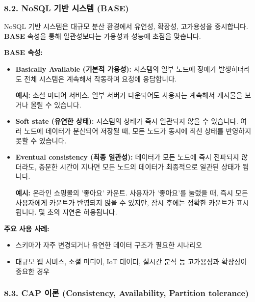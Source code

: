 \documentclass[11pt,a4paper]{article}
\begin{document}
\subsubsection*{8.2. NoSQL 기반 시스템 (BASE)}

\begin{summarybox}
NoSQL 기반 시스템은 대규모 분산 환경에서 유연성, 확장성, 고가용성을 중시합니다. \textbf{BASE} 속성을 통해 일관성보다는 가용성과 성능에 초점을 맞춥니다.
\end{summarybox}

\textbf{BASE 속성:}
\begin{itemize}
    \item \textbf{Basically Available (기본적 가용성):} 시스템의 일부 노드에 장애가 발생하더라도 전체 시스템은 계속해서 작동하며 요청에 응답합니다.
    \begin{examplebox}
    \textbf{예시:} 소셜 미디어 서비스. 일부 서버가 다운되어도 사용자는 계속해서 게시물을 보거나 올릴 수 있습니다.
    \end{examplebox}
    \item \textbf{Soft state (유연한 상태):} 시스템의 상태가 즉시 일관되지 않을 수 있습니다. 여러 노드에 데이터가 분산되어 저장될 때, 모든 노드가 동시에 최신 상태를 반영하지 못할 수 있습니다.
    \item \textbf{Eventual consistency (최종 일관성):} 데이터가 모든 노드에 즉시 전파되지 않더라도, 충분한 시간이 지나면 모든 노드의 데이터가 최종적으로 일관된 상태가 됩니다.
    \begin{examplebox}
    \textbf{예시:} 온라인 쇼핑몰의 '좋아요' 카운트. 사용자가 '좋아요'를 눌렀을 때, 즉시 모든 사용자에게 카운트가 반영되지 않을 수 있지만, 잠시 후에는 정확한 카운트가 표시됩니다. 몇 초의 지연은 허용됩니다.
    \end{examplebox}
\end{itemize}

\textbf{주요 사용 사례:}
\begin{itemize}
    \item 스키마가 자주 변경되거나 유연한 데이터 구조가 필요한 시나리오
    \item 대규모 웹 서비스, 소셜 미디어, IoT 데이터, 실시간 분석 등 고가용성과 확장성이 중요한 경우
\end{itemize}

\subsubsection*{8.3. CAP 이론 (Consistency, Availability, Partition tolerance)}
\end{document}
